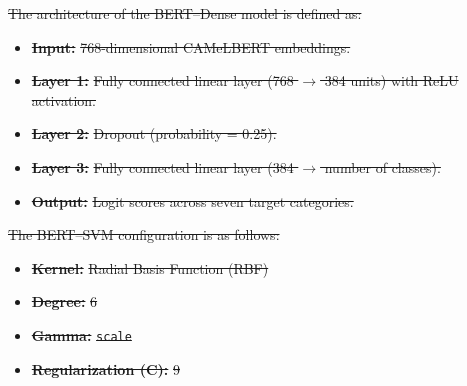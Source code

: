 \documentclass[preprint,12pt,authoryear]{elsarticle}
\providecommand{\DIFdel}[1]{{\protect\color{red}\sout{#1}}}                      %
\providecommand{\DIFdelbegin}{} %
\begin{document}
\DIFdelbegin %
\DIFdel{The architecture of the BERT–Dense model is defined as: }%
\begin{itemize}%
\item%
\textbf{\DIFdel{Input:}} %
\DIFdel{768-dimensional CAMeLBERT embeddings.
}%
\item%
\textbf{\DIFdel{Layer 1:}} %
\DIFdel{Fully connected linear layer (768 $\rightarrow$ 384 units) with ReLU activation.
    }%
\item%
\textbf{\DIFdel{Layer 2:}} %
\DIFdel{Dropout (probability = 0.25).
    }%
\item%
\textbf{\DIFdel{Layer 3:}} %
\DIFdel{Fully connected linear layer (384 $\rightarrow$ number of classes). }%
\item%
\textbf{\DIFdel{Output:}} %
\DIFdel{Logit scores across seven target categories.
}
\end{itemize}%

\DIFdel{The BERT–SVM configuration is as follows: }%
\begin{itemize}%
\item%
\textbf{\DIFdel{Kernel:}} %
\DIFdel{Radial Basis Function (RBF)
    }%
\item%
\textbf{\DIFdel{Degree:}} %
\DIFdel{6
    }%
\item%
\textbf{\DIFdel{Gamma:}} %
\texttt{\DIFdel{scale}}
\item%
\textbf{\DIFdel{Regularization (C):}} %
\DIFdel{9
}
\end{itemize}%
\end{document}
